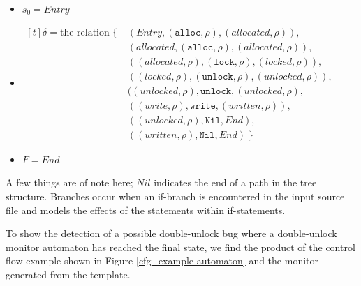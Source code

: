 \begin{itemize}
    \item $s_0 = Entry$ 
    \item {
        $
            \begin{aligned}[t]
            \delta = \text{the relation} \; \{ \; & (Entry, (\texttt{alloc},\rho), (allocated, \rho)), \\ 
            & (allocated, (\texttt{alloc},\rho), (allocated, \rho)), \\ 
            & ((allocated, \rho), (\texttt{lock}, \rho), (locked, \rho)), \\
            & ((locked, \rho), (\texttt{unlock}, \rho), (unlocked, \rho)), \\
            & ((unlocked, \rho), \texttt{unlock}, (unlocked, \rho), \\ 
            & ((write, \rho), \texttt{write}, (written, \rho)), \\ 
            & ((unlocked, \rho), \texttt{Nil}, End), \\ 
            & ((written, \rho), \texttt{Nil}, End) \; \}
            \end{aligned}
        $ 
    }
    \item $F = End$  
\end{itemize}

\noindent A few things are of note here; $Nil$ indicates the end of a path in the tree structure. Branches occur when an if-branch is encountered in the input source file and models the effects of the statements within if-statements.

\newpar To show the detection of a possible double-unlock bug where a double-unlock monitor automaton has reached the final state, we find the product of the control flow example shown in Figure \ref{cfg_example-automaton} and the monitor generated from the template. 

